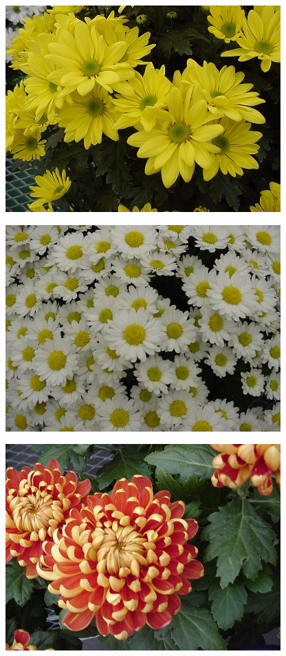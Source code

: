 \documentclass{article}
\begin{document}
\begin{center}
\includegraphics[height=0.925\paperheight]{../Chrysanthemum_Butterfield.jpg}
\end{center}
\newpage

\begin{center}
\includegraphics[height=0.925\paperheight]{../Chrysanthemum_Daisy.jpg}
\end{center}
\newpage

\begin{center}
\includegraphics[height=0.925\paperheight]{../Chrysanthemum_Incurve.jpg}
\end{center}
\newpage
\end{document}
